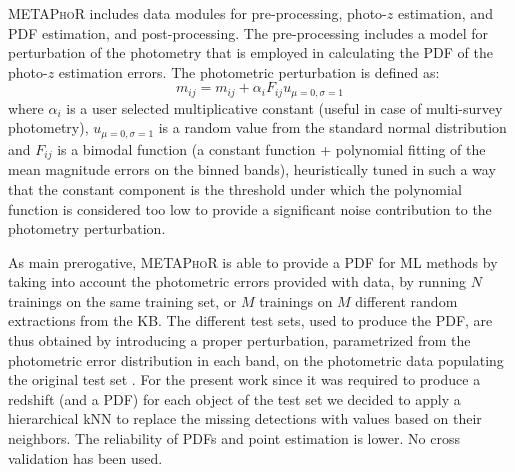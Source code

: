 \textsc{METAPhoR} includes data modules for pre-processing, photo-$z$ estimation, and PDF estimation, and post-processing.  The pre-processing includes a model for perturbation of the photometry that is employed in calculating the PDF of the photo-$z$ estimation errors.
The photometric perturbation is defined as:
\begin{equation}
 m_{ij} = m_{ij} + \alpha_{i}F_{ij}u_{\mu=0,\sigma=1}
\end{equation}
where $\alpha_{i}$ is a user selected multiplicative constant (useful in case of multi-survey photometry), $u_{\mu=0,\sigma=1}$ is a random value from the standard normal distribution and $F_{ij}$ is a bimodal function (a constant function + polynomial fitting of the mean magnitude errors on the binned bands), heuristically tuned in such a way that the constant component is the threshold under which the polynomial function is considered too low to provide a significant noise contribution to the photometry perturbation.



As main prerogative, \textsc{METAPhoR} is able to provide a PDF for ML methods by taking into account the photometric errors provided with data, by running $N$ trainings on the same training set, or $M$ trainings on $M$ different random extractions from the KB.
The different test sets, used to produce the PDF, are thus obtained by introducing a proper perturbation, parametrized from the photometric error distribution in each band, on the photometric data populating the original test set \citep{Brescia:18}.
For the present work since it was required to produce a redshift (and a PDF) for each object of the test set we decided to apply a hierarchical kNN to replace the missing detections with values based on their neighbors.
The reliability of PDFs and point estimation is lower. No cross validation has been used.


